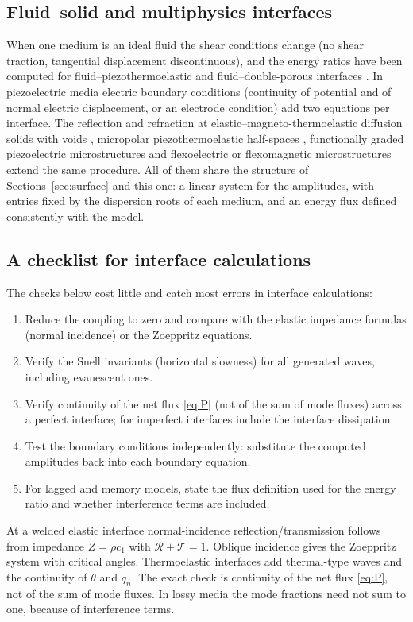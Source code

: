 \subsection{Fluid--solid and multiphysics interfaces}
When one medium is an ideal fluid the shear conditions change (no shear traction, tangential displacement discontinuous), and the energy ratios have been computed for fluid--piezothermoelastic and fluid--double-porous interfaces \citep{Gupta2023IJNMF,Kumar2019,Kumar2025}. In piezoelectric media electric boundary conditions (continuity of potential and of normal electric displacement, or an electrode condition) add two equations per interface. The reflection and refraction at elastic--magneto-thermoelastic diffusion solids with voids \citep{KumarKansal2017}, micropolar piezothermoelastic half-spaces \citep{Kumar2018}, functionally graded piezoelectric microstructures \citep{Liu2020} and flexoelectric or flexomagnetic microstructures \citep{Singh2020c,Jiao2024} extend the same procedure. All of them share the structure of Sections~\ref{sec:surface} and this one: a linear system for the amplitudes, with entries fixed by the dispersion roots of each medium, and an energy flux defined consistently with the model.

\subsection{A checklist for interface calculations}
The checks below cost little and catch most errors in interface calculations:
\begin{enumerate}
\item Reduce the coupling to zero and compare with the elastic impedance formulas (normal incidence) or the Zoeppritz equations.
\item Verify the Snell invariants (horizontal slowness) for all generated waves, including evanescent ones.
\item Verify continuity of the net flux \eqref{eq:P} (not of the sum of mode fluxes) across a perfect interface; for imperfect interfaces include the interface dissipation.
\item Test the boundary conditions independently: substitute the computed amplitudes back into each boundary equation.
\item For lagged and memory models, state the flux definition used for the energy ratio and whether interference terms are included.
\end{enumerate}

\begin{summarybox}[Summary]
At a welded elastic interface normal-incidence reflection/transmission follows from impedance $Z=\rho c_1$ with $\mathcal R+\mathcal T=1$. Oblique incidence gives the Zoeppritz system with critical angles. Thermoelastic interfaces add thermal-type waves and the continuity of $\theta$ and $q_n$. The exact check is continuity of the net flux \eqref{eq:P}, not of the sum of mode fluxes. In lossy media the mode fractions need not sum to one, because of interference terms.
\end{summarybox}
